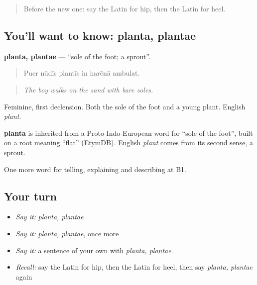 \label{lesson:LA-C518-planta}



\begin{quote}
Before the new one: say the Latin for hip, then the Latin for heel.
\end{quote}

\subsection*{You'll want to know: planta, plantae}
\textbf{planta, plantae} — \textquotedblleft{}sole of the foot; a sprout\textquotedblright{}.

\begin{quote}
Puer nūdīs plantīs in harēnā ambulat.
\end{quote}

\begin{quote}
\emph{The boy walks on the sand with bare soles.}
\end{quote}

Feminine, first declension. Both the sole of the foot and a young plant. English \emph{plant}.

\begin{cousinweb}
\textbf{planta} is inherited from a Proto-Indo-European word for \textquotedblleft{}sole of the foot\textquotedblright{}, built on a root meaning \textquotedblleft{}flat\textquotedblright{} (EtymDB). English \emph{plant} comes from its second sense, a sprout.
\end{cousinweb}

\begin{grammarlens}[title={What you've built}]
One more word for telling, explaining and describing at B1.
\end{grammarlens}

\subsection*{Your turn}
\begin{itemize}
\raggedright
  \item \emph{Say it:} \emph{planta, plantae}
  \item \emph{Say it:} \emph{planta, plantae}, once more
  \item \emph{Say it:} a sentence of your own with \emph{planta, plantae}
  \item \emph{Recall:} say the Latin for hip, then the Latin for heel, then say \emph{planta, plantae} again
\end{itemize}

